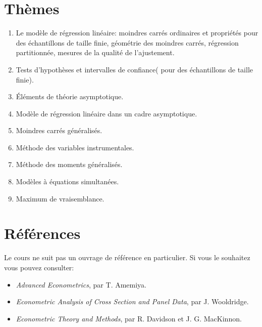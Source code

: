 \section*{Thèmes}
\begin{enumerate}
\item Le modèle de régression linéaire: moindres carrés ordinaires et propriétés pour des échantillons de taille finie, géométrie des moindres carrés, régression partitionnée, mesures de la qualité de l'ajustement.
\item Tests d'hypothèses et intervalles de confiance( pour des échantillons de taille finie).
\item \'Eléments de théorie asymptotique.
\item Modèle de régression linéaire dans un cadre asymptotique.
\item Moindres carrés généralisés.
\item Méthode des variables instrumentales.
\item Méthode des moments généralisés.
\item Modèles à équations simultanées.
\item Maximum de vraisemblance.
\end{enumerate}

\section*{Références}
Le cours ne suit pas un ouvrage de référence en particulier. Si vous le souhaitez vous  pouvez consulter:
\begin{itemize}
\item \emph{Advanced Econometrics}, par T. Amemiya.
\item \emph{Econometric Analysis of Cross Section and Panel Data}, par J. Wooldridge.
\item \emph{Econometric Theory and Methods}, par R. Davidson et  J. G. MacKinnon.
\end{itemize}

